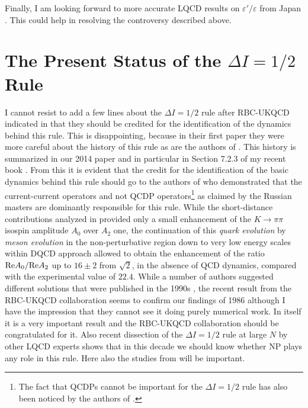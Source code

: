 \documentclass[12pt,a4paper]{article}
\newcommand{\RE}{{\rm Re}}
\def\epe{\varepsilon'/\varepsilon}
\begin{document}
  Finally, I am looking forward to more accurate LQCD results on $\epe$ from
  Japan \cite{Ishizuka:2018qbn}. This could help in resolving the controversy
  described above.

 \boldmath 
 \section{The Present Status of the $\Delta I=1/2$ Rule}\label{Sec6}
 \unboldmath
 I cannot resist to add a few lines about the $\Delta I=1/2$ rule \cite{GellMann:1955jx,GellMann:1957wh} after
 RBC-UKQCD indicated in  \cite{Abbott:2020hxn} that they should be credited
 for the identification of the dynamics behind this rule. This is disappointing,
 because in their first paper \cite{Boyle:2012ys} they were more careful
 about the history of this rule as are the authors of
\cite{Donini:2020qfu,Hernandez:2020tbc}.
 This history is summarized in our 2014 paper
 \cite{Buras:2014maa} and in particular in Section 7.2.3 of my recent book \cite{Buras:2020xsm}.
 From this it is evident that the credit for the identification of the
 basic dynamics behind this rule should go to the authors of \cite{Bardeen:1986vz} who demonstrated that the current-current operators and not QCDP operators\footnote{The fact that QCDPs cannot be important for the $\Delta I=1/2$ rule has
   also been noticed by the authors of \cite{Chivukula:1986du}.}
 as claimed by the Russian masters \cite{Shifman:1975tn} are dominantly responsible for this rule. While the short-distance contributions analyzed in \cite{Altarelli:1974exa,Gaillard:1974nj} provided only a small enhancement
 of the $K\to\pi\pi$ isospin amplitude $A_0$ over $A_2$ one, the continuation
 of this {\em quark evolution} by {\em meson evolution} in the non-perturbative
 region down to very low energy scales within DQCD approach allowed to
 obtain the enhancement of the ratio ${\RE A_0}/{\RE A_2}$ up to $16\pm 2$ from $\sqrt{2}$, in the absence of QCD dynamics, compared with the experimental value of $22.4$. While a number
 of authors suggested different solutions that were published in the 1990s \cite{Pich:1990mw,Jamin:1994sv,Antonelli:1995gw,Pich:1995qp,Bertolini:1997ir,Bertolini:1998vd,Bijnens:1998ee,Hambye:1998sma,Crewther:2013vea}, the recent result from  the RBC-UKQCD collaboration seems to confirm our findings of 1986 although I have the impression that they cannot see it doing purely numerical  work. In itself it is a very important result and the RBC-UKQCD
 collaboration should be congratulated for it. Also recent dissection of the
 $\Delta I=1/2$ rule at large $N$  by other LQCD experts
 \cite{Donini:2020qfu,Hernandez:2020tbc} shows that in this decade we should know whether NP plays any role in this
 rule. Here also the studies from \cite{Ishizuka:2018qbn} will be important.
\end{document}
